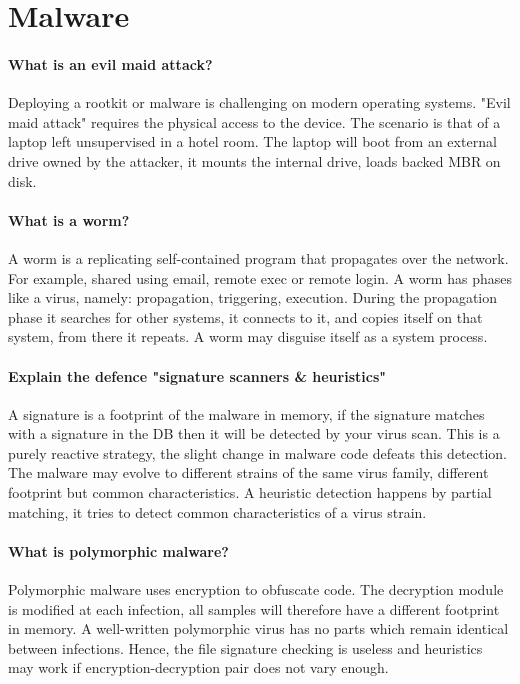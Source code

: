\section{Malware}
\paragraph{What is an evil maid attack?}
Deploying a rootkit or malware is challenging on modern operating systems. "Evil maid attack" requires the physical access to the device. The scenario is that of a laptop left unsupervised in a hotel room. The laptop will boot from an external drive owned by the attacker, it mounts the internal drive, loads backed MBR on disk. 

\paragraph{What is a worm?}
A worm is a replicating self-contained program that propagates over the network. For example, shared using email, remote exec or remote login. A worm has phases like a virus, namely: propagation, triggering, execution. During the propagation phase it searches for other systems, it connects to it, and copies itself on that system, from there it repeats. A worm may disguise itself as a system process.

\paragraph{Explain the defence "signature scanners \& heuristics"}
A signature is a footprint of the malware in memory, if the signature matches with a signature in the DB then it will be detected by your virus scan. This is a purely reactive strategy, the slight change in malware code defeats this detection. The malware may evolve to different strains of the same virus family, different footprint but common characteristics. A heuristic detection happens by partial matching, it tries to detect common characteristics of a virus strain.

\paragraph{What is polymorphic malware?}
Polymorphic malware uses encryption to obfuscate code. The decryption module is modified at each infection, all samples will therefore have a different footprint in memory. A well-written polymorphic virus has no parts which remain identical between infections. Hence, the file signature checking is useless and heuristics may work if encryption-decryption pair does not vary enough.

